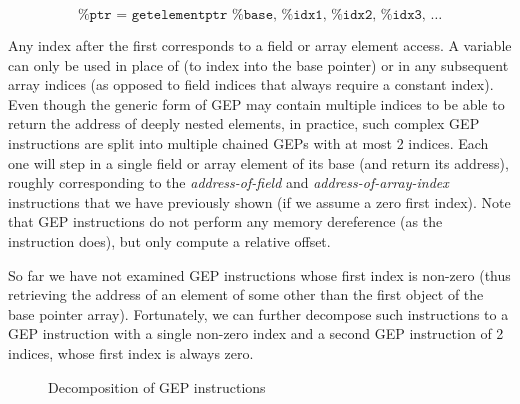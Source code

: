 \[
  \texttt{
  }
  \ldots
\]

Any index after the first corresponds to a field or array element
access. A variable can only be used in place of  (to
index into the base pointer) or in any subsequent array indices (as
opposed to field indices that always require a constant index). Even
though the generic form of GEP may contain multiple indices to be able
to return the address of deeply nested elements, in practice, such
complex GEP instructions are split into multiple chained GEPs with at
most 2 indices. Each one will step in a single field or array element
of its base (and return its address), roughly corresponding to the
\emph{address-of-field} and \emph{address-of-array-index} instructions
that we have previously shown (if we assume a zero first index). Note
that GEP instructions do not perform any memory dereference (as the
instruction  does), but only compute a relative offset.

So far we have not examined GEP instructions whose first index is
non-zero (thus retrieving the address of an element of some other than
the first object of the base pointer array). Fortunately, we can
further decompose such instructions to a GEP instruction with a single
non-zero index and a second GEP instruction of 2 indices, whose first
index is always zero.

\begin{figure}[h!t]
  \centering
  \begin{minipage}[b]{.4\linewidth}
    \centering
    \begin{bitcode}
    \end{bitcode}
    \label{structsens/fig/gep1}
  \end{minipage}%
  \qquad
  \begin{minipage}[b]{.4\linewidth}
    \centering
    \begin{bitcode}
    \end{bitcode}
    \label{structsens/fig/gep2}\par\vfill
  \end{minipage}
  \caption{Decomposition of GEP instructions}
  \label{structsens/fig/gep}
\end{figure}

